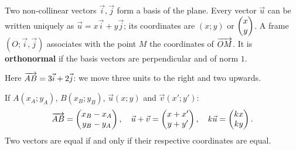 \begin{cours}[Definitions]
Two non-collinear vectors $\vec i,\vec j$ form a basis of the plane. Every vector $\vec u$ can be written uniquely as $\vec u=x\vec i+y\vec j$; its coordinates are $(x;y)$ or $\begin{pmatrix}x\\y\end{pmatrix}$.
A frame $(O;\vec i,\vec j)$ associates with the point $M$ the coordinates of $\overrightarrow{OM}$. It is \textbf{orthonormal} if the basis vectors are perpendicular and of norm $1$.
\end{cours}
\begin{center}\end{center}
Here $\overrightarrow{AB}=3\vec i+2\vec j$: we move three units to the right and two upwards.
\begin{cours}
If $A(x_A;y_A)$, $B(x_B;y_B)$, $\vec u(x;y)$ and $\vec v(x';y')$:
\[\overrightarrow{AB}=\begin{pmatrix}x_B-x_A\\y_B-y_A\end{pmatrix},\quad \vec u+\vec v=\begin{pmatrix}x+x'\\y+y'\end{pmatrix},\quad k\vec u=\begin{pmatrix}kx\\ky\end{pmatrix}.\]
Two vectors are equal if and only if their respective coordinates are equal.
\end{cours}

